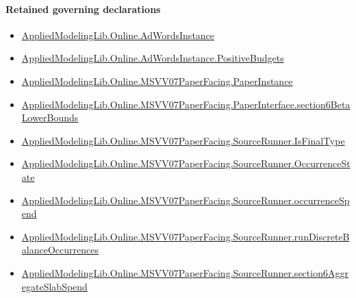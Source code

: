\documentclass[10pt]{article}
\begin{document}
\paragraph{Retained governing declarations}
\begin{itemize}\raggedright
\item \hyperlink{governing-declaration-e5ce49672bf26ab1}{Applied\allowbreak{}Modeling\allowbreak{}Lib.\allowbreak{}Online.\allowbreak{}Ad\allowbreak{}Words\allowbreak{}Instance}
\item \hyperlink{governing-declaration-eabdcef9dca00922}{Applied\allowbreak{}Modeling\allowbreak{}Lib.\allowbreak{}Online.\allowbreak{}Ad\allowbreak{}Words\allowbreak{}Instance.\allowbreak{}Positive\allowbreak{}Budgets}
\item \hyperlink{governing-declaration-11907576ec71eeb5}{Applied\allowbreak{}Modeling\allowbreak{}Lib.\allowbreak{}Online.\allowbreak{}MSVV07\allowbreak{}Paper\allowbreak{}Facing.\allowbreak{}Paper\allowbreak{}Instance}
\item \hyperlink{governing-declaration-8fe14cd293821d8c}{Applied\allowbreak{}Modeling\allowbreak{}Lib.\allowbreak{}Online.\allowbreak{}MSVV07\allowbreak{}Paper\allowbreak{}Facing.\allowbreak{}Paper\allowbreak{}Interface.\allowbreak{}section6\allowbreak{}Beta\allowbreak{}Lower\allowbreak{}Bounds}
\item \hyperlink{paper-prerequisite-b03abe34f2413cec}{Applied\allowbreak{}Modeling\allowbreak{}Lib.\allowbreak{}Online.\allowbreak{}MSVV07\allowbreak{}Paper\allowbreak{}Facing.\allowbreak{}Source\allowbreak{}Runner.\allowbreak{}Is\allowbreak{}Final\allowbreak{}Type}
\item \hyperlink{governing-declaration-2eff7815f49c1d41}{Applied\allowbreak{}Modeling\allowbreak{}Lib.\allowbreak{}Online.\allowbreak{}MSVV07\allowbreak{}Paper\allowbreak{}Facing.\allowbreak{}Source\allowbreak{}Runner.\allowbreak{}Occurrence\allowbreak{}State}
\item \hyperlink{governing-declaration-7fc0f371ea84f275}{Applied\allowbreak{}Modeling\allowbreak{}Lib.\allowbreak{}Online.\allowbreak{}MSVV07\allowbreak{}Paper\allowbreak{}Facing.\allowbreak{}Source\allowbreak{}Runner.\allowbreak{}occurrence\allowbreak{}Spend}
\item \hyperlink{governing-declaration-409a1b8afc11b29a}{Applied\allowbreak{}Modeling\allowbreak{}Lib.\allowbreak{}Online.\allowbreak{}MSVV07\allowbreak{}Paper\allowbreak{}Facing.\allowbreak{}Source\allowbreak{}Runner.\allowbreak{}run\allowbreak{}Discrete\allowbreak{}Balance\allowbreak{}Occurrences}
\item \hyperlink{paper-prerequisite-b6e94f37595e1e04}{Applied\allowbreak{}Modeling\allowbreak{}Lib.\allowbreak{}Online.\allowbreak{}MSVV07\allowbreak{}Paper\allowbreak{}Facing.\allowbreak{}Source\allowbreak{}Runner.\allowbreak{}section6\allowbreak{}Aggregate\allowbreak{}Slab\allowbreak{}Spend}

\end{itemize}
\end{document}
